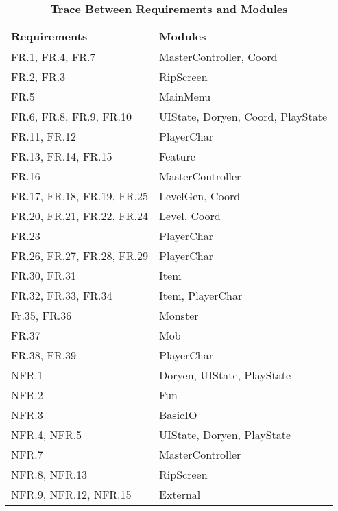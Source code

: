 \documentclass[12pt, titlepage]{article}
\begin{document}
    \begin{table}[H]
        \label{TblRT}
        \caption{\bf Trace Between Requirements and Modules}
        
        \def\arraystretch{1.1}
        \centering
        \bigskip
        \begin{tabular}{p{} p{}}

            \toprule
            \textbf{Requirements} & \textbf{Modules}\\
            \midrule

            FR.1, FR.4, FR.7 & MasterController, Coord\\
            FR.2, FR.3 & RipScreen\\
            FR.5 & MainMenu\\
            FR.6, FR.8, FR.9, FR.10 & UIState, Doryen, Coord, PlayState\\
            FR.11, FR.12 & PlayerChar\\
            FR.13, FR.14, FR.15 & Feature\\
            FR.16 & MasterController\\
            FR.17, FR.18, FR.19, FR.25 & LevelGen, Coord\\
            FR.20, FR.21, FR.22, FR.24 & Level, Coord\\
            FR.23 & PlayerChar\\
            FR.26, FR.27, FR.28, FR.29 & PlayerChar\\
            FR.30, FR.31 & Item\\
            FR.32, FR.33, FR.34 & Item, PlayerChar\\
            Fr.35, FR.36 & Monster\\
            FR.37 & Mob\\
            FR.38, FR.39 & PlayerChar\\
            \midrule
            NFR.1 & Doryen, UIState, PlayState\\
            NFR.2 & Fun\\
            NFR.3 & BasicIO\\
            NFR.4, NFR.5 & UIState, Doryen, PlayState\\
            NFR.7 & MasterController\\
            NFR.8, NFR.13 & RipScreen\\
            NFR.9, NFR.12, NFR.15 & External\\

            \bottomrule
        \end{tabular}
    \end{table}
\end{document}
